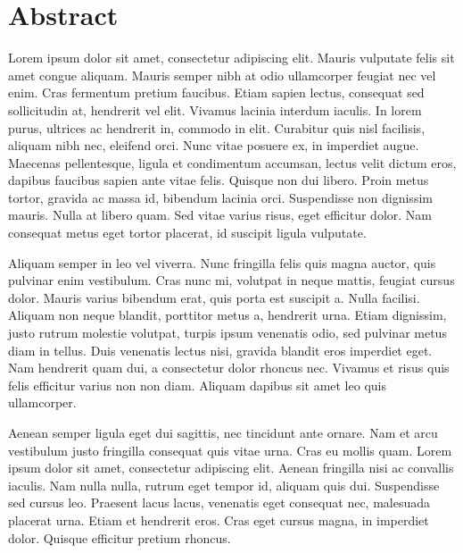 \newpage\pagestyle{plain}

\chapter*{Abstract}

Lorem ipsum dolor sit amet, consectetur adipiscing elit. Mauris vulputate felis sit amet congue aliquam. Mauris semper nibh at odio ullamcorper feugiat nec vel enim. Cras fermentum pretium faucibus. Etiam sapien lectus, consequat sed sollicitudin at, hendrerit vel elit. Vivamus lacinia interdum iaculis. In lorem purus, ultrices ac hendrerit in, commodo in elit. Curabitur quis nisl facilisis, aliquam nibh nec, eleifend orci. Nunc vitae posuere ex, in imperdiet augue. Maecenas pellentesque, ligula et condimentum accumsan, lectus velit dictum eros, dapibus faucibus sapien ante vitae felis. Quisque non dui libero. Proin metus tortor, gravida ac massa id, bibendum lacinia orci. Suspendisse non dignissim mauris. Nulla at libero quam. Sed vitae varius risus, eget efficitur dolor. Nam consequat metus eget tortor placerat, id suscipit ligula vulputate.

Aliquam semper in leo vel viverra. Nunc fringilla felis quis magna auctor, quis pulvinar enim vestibulum. Cras nunc mi, volutpat in neque mattis, feugiat cursus dolor. Mauris varius bibendum erat, quis porta est suscipit a. Nulla facilisi. Aliquam non neque blandit, porttitor metus a, hendrerit urna. Etiam dignissim, justo rutrum molestie volutpat, turpis ipsum venenatis odio, sed pulvinar metus diam in tellus. Duis venenatis lectus nisi, gravida blandit eros imperdiet eget. Nam hendrerit quam dui, a consectetur dolor rhoncus nec. Vivamus et risus quis felis efficitur varius non non diam. Aliquam dapibus sit amet leo quis ullamcorper.

Aenean semper ligula eget dui sagittis, nec tincidunt ante ornare. Nam et arcu vestibulum justo fringilla consequat quis vitae urna. Cras eu mollis quam. Lorem ipsum dolor sit amet, consectetur adipiscing elit. Aenean fringilla nisi ac convallis iaculis. Nam nulla nulla, rutrum eget tempor id, aliquam quis dui. Suspendisse sed cursus leo. Praesent lacus lacus, venenatis eget consequat nec, malesuada placerat urna. Etiam et hendrerit eros. Cras eget cursus magna, in imperdiet dolor. Quisque efficitur pretium rhoncus.
